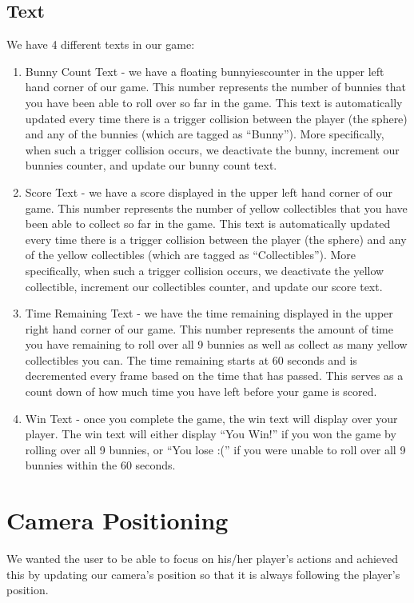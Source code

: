 \documentclass[12pt]{article}
\begin{document}
\subsection{Text}

We have 4 different texts in our game:

\begin{enumerate}
  \item Bunny Count Text - we have a floating bunnyiescounter in the upper left hand corner of our game. This number represents the number of bunnies that you have been able to roll over so far in the game. This text is automatically updated every time there is a trigger collision between the player (the sphere) and any of the bunnies (which are tagged as ``Bunny''). More specifically, when such a trigger collision occurs, we deactivate the bunny, increment our bunnies counter, and update our bunny count text.
  \item Score Text - we have a score displayed in the upper left hand corner of our game. This number represents the number of yellow collectibles that you have been able to collect so far in the game. This text is automatically updated every time there is a trigger collision between the player (the sphere) and any of the yellow collectibles (which are tagged as ``Collectibles''). More specifically, when such a trigger collision occurs, we deactivate the yellow collectible, increment our collectibles counter, and update our score text.
  \item Time Remaining Text - we have the time remaining displayed in the upper right hand corner of our game. This number represents the amount of time you have remaining to roll over all 9 bunnies as well as collect as many yellow collectibles you can. The time remaining starts at 60 seconds and is decremented every frame based on the time that has passed. This serves as a count down of how much time you have left before your game is scored.
  \item Win Text - once you complete the game, the win text will display over your player. The win text will either display ``You Win!'' if you won the game by rolling over all 9 bunnies, or ``You lose :('' if you were unable to roll over all 9 bunnies within the 60 seconds.
\end{enumerate}




\section{Camera Positioning}
  We wanted the user to be able to focus on his/her player's actions and achieved this by updating our camera's position so that it is always following the player's position. 
\end{document}
